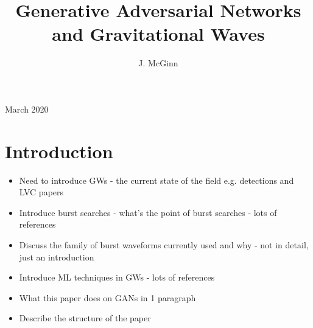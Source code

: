 \documentclass[12pt]{iopart}
\begin{document}
\title{Generative Adversarial Networks and Gravitational Waves}

\author{J. McGinn}

\address{University of Glasgow, Physics \& Astronomy Department, Glasgow G12 8QQ, UK}
\vspace{10pt}
\begin{indented}
\item[]March 2020
\end{indented}

\begin{abstract}

\end{abstract}

%
%
%
% 
%



\section{Introduction}
\begin{itemize}
\item Need to introduce GWs - the current state of the field e.g. detections
and LVC papers 
\item Introduce burst searches - what's the point of burst searches  - lots of references 
\item Discuss the family of burst waveforms currently used and why - not in detail, just
an introduction 
\item Introduce ML techniques in GWs  - lots of references
\item What this paper does on GANs in 1 paragraph 
\item Describe the structure of the paper 
\end{itemize}
\end{document}
